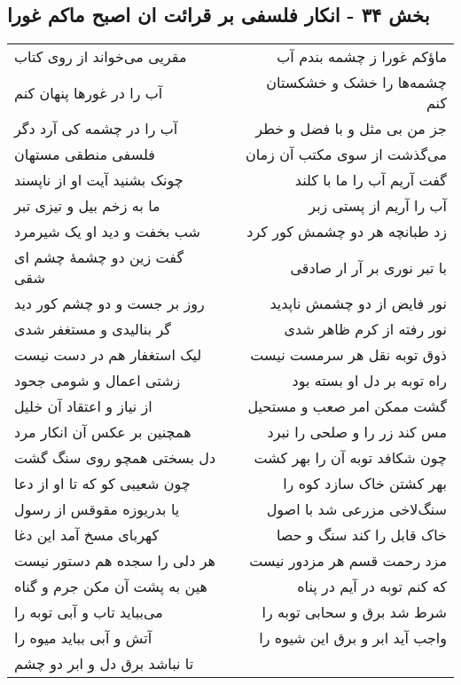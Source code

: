 \begin{center}
\section*{بخش ۳۴ - انکار فلسفی بر قرائت ان اصبح ماکم غورا}
\label{sec:sh034}
\begin{longtable}{l p{0.5cm} r}
مقریی می‌خواند از روی کتاب
&&
ماؤکم غورا ز چشمه بندم آب
\\
آب را در غورها پنهان کنم
&&
چشمه‌ها را خشک و خشکستان کنم
\\
آب را در چشمه کی آرد دگر
&&
جز من بی مثل و با فضل و خطر
\\
فلسفی منطقی مستهان
&&
می‌گذشت از سوی مکتب آن زمان
\\
چونک بشنید آیت او از ناپسند
&&
گفت آریم آب را ما با کلند
\\
ما به زخم بیل و تیزی تبر
&&
آب را آریم از پستی زبر
\\
شب بخفت و دید او یک شیرمرد
&&
زد طبانچه هر دو چشمش کور کرد
\\
گفت زین دو چشمهٔ چشم ای شقی
&&
با تبر نوری بر آر ار صادقی
\\
روز بر جست و دو چشم کور دید
&&
نور فایض از دو چشمش ناپدید
\\
گر بنالیدی و مستغفر شدی
&&
نور رفته از کرم ظاهر شدی
\\
لیک استغفار هم در دست نیست
&&
ذوق توبه نقل هر سرمست نیست
\\
زشتی اعمال و شومی جحود
&&
راه توبه بر دل او بسته بود
\\
از نیاز و اعتقاد آن خلیل
&&
گشت ممکن امر صعب و مستحیل
\\
همچنین بر عکس آن انکار مرد
&&
مس کند زر را و صلحی را نبرد
\\
دل بسختی همچو روی سنگ گشت
&&
چون شکافد توبه آن را بهر کشت
\\
چون شعیبی کو که تا او از دعا
&&
بهر کشتن خاک سازد کوه را
\\
یا بدریوزه مقوقس از رسول
&&
سنگ‌لاخی مزرعی شد با اصول
\\
کهربای مسخ آمد این دغا
&&
خاک قابل را کند سنگ و حصا
\\
هر دلی را سجده هم دستور نیست
&&
مزد رحمت قسم هر مزدور نیست
\\
هین به پشت آن مکن جرم و گناه
&&
که کنم توبه در آیم در پناه
\\
می‌بباید تاب و آبی توبه را
&&
شرط شد برق و سحابی توبه را
\\
آتش و آبی بباید میوه را
&&
واجب آید ابر و برق این شیوه را
\\
تا نباشد برق دل و ابر دو چشم

\end{longtable}
\end{center}

